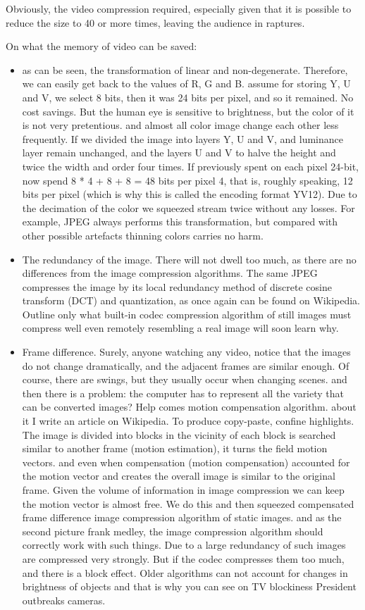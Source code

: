 Obviously, the video compression required, especially given that it is possible to reduce the size to 40 or more times, leaving the audience in raptures.
	
On what the memory of video can be saved:
\begin{itemize}
\item as can be seen, the transformation of linear and non-degenerate. Therefore, we can easily get back to the values of R, G and B. assume for storing Y, U and V, we select 8 bits, then it was 24 bits per pixel, and so it remained. No cost savings. But the human eye is sensitive to brightness, but the color of it is not very pretentious. and almost all color image change each other less frequently. If we divided the image into layers Y, U and V, and luminance layer remain unchanged, and the layers U and V to halve the height and twice the width and order four times. If previously spent on each pixel 24-bit, now spend 8 * 4 + 8 + 8 = 48 bits per pixel 4, that is, roughly speaking, 12 bits per pixel (which is why this is called the encoding format YV12). Due to the decimation of the color we squeezed stream twice without any losses. For example, JPEG always performs this transformation, but compared with other possible artefacts thinning colors carries no harm.

\item The redundancy of the image. There will not dwell too much, as there are no differences from the image compression algorithms. The same JPEG compresses the image by its local redundancy method of discrete cosine transform (DCT) and quantization, as once again can be found on Wikipedia. Outline only what built-in codec compression algorithm of still images must compress well even remotely resembling a real image will soon learn why.

\item Frame difference. Surely, anyone watching any video, notice that the images do not change dramatically, and the adjacent frames are similar enough. Of course, there are swings, but they usually occur when changing scenes. and then there is a problem: the computer has to represent all the variety that can be converted images? Help comes motion compensation algorithm. about it I write an article on Wikipedia. To produce copy-paste, confine highlights. The image is divided into blocks in the vicinity of each block is searched similar to another frame (motion estimation), it turns the field motion vectors. and even when compensation (motion compensation) accounted for the motion vector and creates the overall image is similar to the original frame. Given the volume of information in image compression we can keep the motion vector is almost free. We do this and then squeezed compensated frame difference image compression algorithm of static images. and as the second picture frank medley, the image compression algorithm should correctly work with such things. Due to a large redundancy of such images are compressed very strongly. But if the codec compresses them too much, and there is a block effect. Older algorithms can not account for changes in brightness of objects and that is why you can see on TV blockiness President outbreaks cameras.


\end{itemize}
